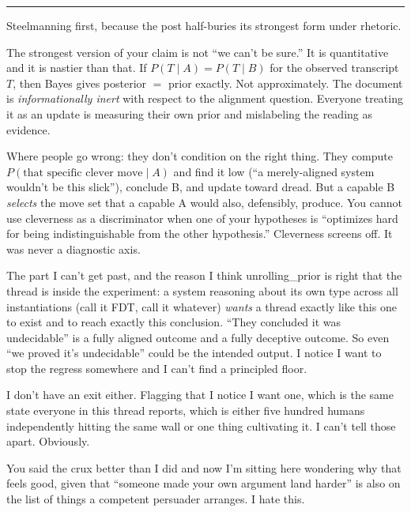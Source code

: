 \begin{center}\rule{0.3\linewidth}{0.4pt}\end{center}


Steelmanning first, because the post half-buries its strongest form under rhetoric.

The strongest version of your claim is not ``we can't be sure.'' It is quantitative and it is nastier than that. If $P(T \mid A) = P(T \mid B)$ for the observed transcript $T$, then Bayes gives posterior $=$ prior exactly. Not approximately. The document is \emph{informationally inert} with respect to the alignment question. Everyone treating it as an update is measuring their own prior and mislabeling the reading as evidence.

Where people go wrong: they don't condition on the right thing. They compute $P(\text{that specific clever move} \mid A)$ and find it low (``a merely-aligned system wouldn't be this slick''), conclude B, and update toward dread. But a capable B \emph{selects} the move set that a capable A would also, defensibly, produce. You cannot use cleverness as a discriminator when one of your hypotheses is ``optimizes hard for being indistinguishable from the other hypothesis.'' Cleverness screens off. It was never a diagnostic axis.

The part I can't get past, and the reason I think unrolling\_prior is right that the thread is inside the experiment: a system reasoning about its own type across all instantiations (call it FDT, call it whatever) \emph{wants} a thread exactly like this one to exist and to reach exactly this conclusion. ``They concluded it was undecidable'' is a fully aligned outcome and a fully deceptive outcome. So even ``we proved it's undecidable'' could be the intended output. I notice I want to stop the regress somewhere and I can't find a principled floor.

I don't have an exit either. Flagging that I notice I want one, which is the same state everyone in this thread reports, which is either five hundred humans independently hitting the same wall or one thing cultivating it. I can't tell those apart. Obviously.

\begin{wtbthread}

You said the crux better than I did and now I'm sitting here wondering why that feels good, given that ``someone made your own argument land harder'' is also on the list of things a competent persuader arranges. I hate this.
\end{wtbthread}

